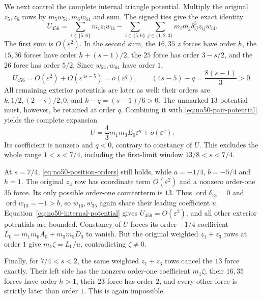 \documentclass[11pt]{amsart}
\theoremstyle{remark}
\newcommand{\ord}{\operatorname{ord}}
\begin{document}
We next control the complete internal triangle potential.
Multiply the original $z_5,z_6$ rows by $m_5w_{54},m_6w_{64}$
and sum. The signed ties give the exact identity
\begin{equation}\label{eq:no50-internal-potential}
 U_{456}
 =\sum_{i\in\{5,6\}}m_iz_iw_{i4}
 -\sum_{i\in\{5,6\}}\sum_{j\in\{1,2,3\}}
 m_im_j\delta_{ij}^3z_{ij}w_{i4}.
\end{equation}
The first sum is $O(\varepsilon^2)$. In the second sum, the
$16,35$ $z$ forces have order $h$, the $15,36$ forces have
order $h+(s-1)/2$, the $25$ force has order $3-s/2$, and
the $26$ force has order $5/2$. Since $w_{54},w_{64}$ have
order $1$,
\[
 U_{456}=O(\varepsilon^2)+O(\varepsilon^{4s-5})
 =o(\varepsilon^q),\qquad (4s-5)-q=\frac{8(s-1)}3>0.
\]
All remaining exterior potentials are later as well: their
orders are $k,1/2,(2-s)/2,0$, and
$k-q=(s-1)/6>0$. The unmarked $13$ potential must, however,
be retained at order $q$. Combining it with
\eqref{eq:no50-pair-potential} yields the complete expansion
\begin{equation}\label{eq:no50-complete-potential}
 U=\frac43m_1m_3E_0\varepsilon^q+o(\varepsilon^q).
\end{equation}
Its coefficient is nonzero and $q<0$, contrary to constancy
of $U$. This excludes the whole range $1<s<7/4$, including
the first-limit window $13/8<s<7/4$.

At $s=7/4$, \eqref{eq:no50-position-orders} still holds,
while $a=-1/4$, $b=-5/4$ and $h=1$. The original $z_3$ row
has coordinate term $O(\varepsilon^2)$ and a nonzero
order-one $35$ force. Its only possible order-one counterterm
is $13$. Thus $\ord\delta_{13}=0$ and $\ord w_{13}=-1>b$,
so $w_{16},w_{35}$ again share their leading coefficient $u$.
Equation~\eqref{eq:no50-internal-potential} gives
$U_{456}=O(\varepsilon^2)$, and all other exterior potentials
are bounded. Constancy of $U$ forces its order-$-1/4$
coefficient $L_0=m_1m_6A_0+m_3m_5D_0$ to vanish. But the
original weighted $z_1+z_3$ rows at order $1$ give
$m_1\zeta=L_0/u$, contradicting $\zeta\ne0$.

Finally, for $7/4<s<2$, the same weighted $z_1+z_3$ rows
cancel the $13$ force exactly. Their left side has the
nonzero order-one coefficient $m_1\zeta$; their $16,35$
forces have order $h>1$, their $23$ force has order $2$,
and every other force is strictly later than order $1$.
This is again impossible.
\end{document}
